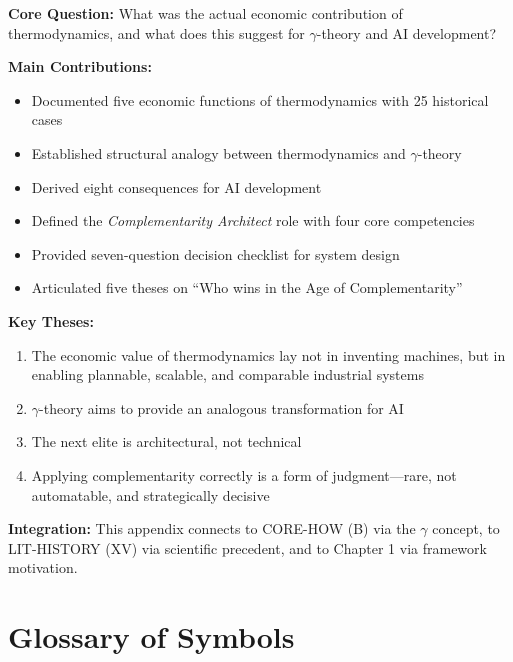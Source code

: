 \begin{tcolorbox}[colback=green!10!white, colframe=green!75!black,
    title=\textbf{Appendix XVII: Summary}]

\textbf{Core Question:} What was the actual economic contribution of thermodynamics,
and what does this suggest for $\gamma$-theory and AI development?

\textbf{Main Contributions:}
\begin{itemize}[nosep]
    \item Documented five economic functions of thermodynamics with 25 historical cases
    \item Established structural analogy between thermodynamics and $\gamma$-theory
    \item Derived eight consequences for AI development
    \item Defined the \textit{Complementarity Architect} role with four core competencies
    \item Provided seven-question decision checklist for system design
    \item Articulated five theses on ``Who wins in the Age of Complementarity''
\end{itemize}

\textbf{Key Theses:}
\begin{enumerate}[nosep]
    \item The economic value of thermodynamics lay not in inventing machines, but in
    enabling plannable, scalable, and comparable industrial systems
    \item $\gamma$-theory aims to provide an analogous transformation for AI
    \item The next elite is architectural, not technical
    \item Applying complementarity correctly is a form of judgment---rare, not automatable,
    and strategically decisive
\end{enumerate}

\textbf{Integration:} This appendix connects to CORE-HOW (B) via the $\gamma$
concept, to LIT-HISTORY (XV) via scientific precedent, and to Chapter 1 via
framework motivation.

\end{tcolorbox}


\section{Glossary of Symbols}
\label{sec:thermo-glossary}

